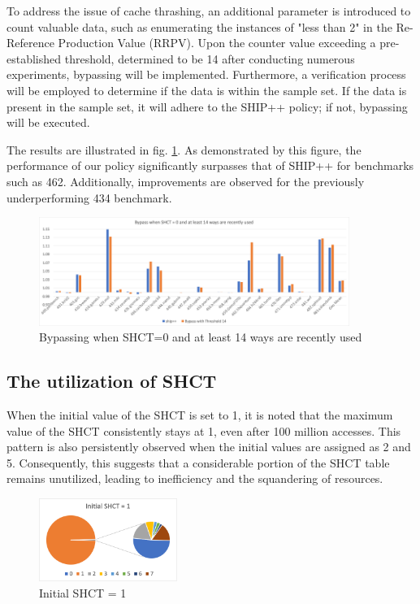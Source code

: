 To address the issue of cache thrashing, an additional parameter is introduced to count valuable data, such as enumerating the instances of "less than 2" in the Re-Reference Production Value (RRPV). Upon the counter value exceeding a pre-established threshold, determined to be 14 after conducting numerous experiments, bypassing will be implemented. Furthermore, a verification process will be employed to determine if the data is within the sample set. If the data is present in the sample set, it will adhere to the SHIP++ policy; if not, bypassing will be executed.\par 
The results are illustrated in fig. \ref{fig.Picture5}. As demonstrated by this figure, the performance of our policy significantly surpasses that of SHIP++ for benchmarks such as 462. Additionally, improvements are observed for the previously underperforming 434 benchmark.\par 

\begin{figure}[htbp]
\centering
\includegraphics[width=0.9\textwidth]{figs/Picture5.png}
\caption{Bypassing when SHCT=0 and at least 14 ways are recently used}
\label{fig.Picture5}
\end{figure}

\subsection{The utilization of SHCT}
When the initial value of the SHCT is set to 1, it is noted that the maximum value of the SHCT consistently stays at 1, even after 100 million accesses. This pattern is also persistently observed when the initial values are assigned as 2 and 5. Consequently, this suggests that a considerable portion of the SHCT table remains unutilized, leading to inefficiency and the squandering of resources.
\begin{figure}[htbp]
\centering
\includegraphics[width=0.4\textwidth]{figs/Picture1.png}
\caption{Initial SHCT = 1}
\label{fig.Picture1}
\end{figure}

